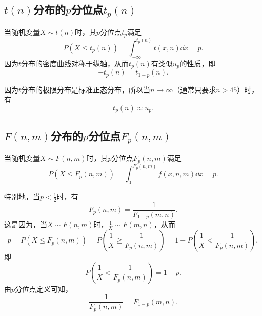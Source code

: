 \subsection{\texorpdfstring{\(t(n)\)分布的\(p\)分位点\(t_p(n)\)}{t分布的p分位点}}
当随机变量\(X \sim t(n)\)时，其\(p\)分位点\(t_p\)满足\[
P(X \leq t_p(n))
= \int_{-\infty}^{t_p(n)} t(x,n) \dd{x} = p.
\]因为\(t\)分布的密度曲线对称于纵轴，从而\(t_p(n)\)有类似\(u_p\)的性质，即\begin{equation}
-t_p(n)=t_{1-p}(n).
\end{equation}

因为\(t\)分布的极限分布是标准正态分布，所以当\(n\to\infty\)（通常只要求\(n>45\)）时，有\[
t_p(n) \approx u_p.
\]

\subsection{\texorpdfstring{\(F(n,m)\)分布的\(p\)分位点\(F_p(n,m)\)}{F分布的p分位点}}
当随机变量\(X \sim F(n,m)\)时，其\(p\)分位点\(F_p(n,m)\)满足\[
P(X \leq F_p(n,m)) = \int_0^{F_p(n,m)} f(x,n,m) \dd{x} = p.
\]

特别地，当\(p<\frac{1}{2}\)时，有\begin{equation}
F_p(n,m) = \frac{1}{F_{1-p}(m,n)}.
\end{equation}
这是因为，当\(X \sim F(n,m)\)时，\(\frac{1}{X} \sim F(m,n)\)，从而\[
p = P(X \leq F_p(n,m))
= P\left(\frac{1}{X} \geq \frac{1}{F_p(n,m)}\right)
= 1 - P\left(\frac{1}{X} < \frac{1}{F_p(n,m)}\right),
\]即\[
P\left(\frac{1}{X} < \frac{1}{F_p(n,m)}\right) = 1 - p.
\]由\(p\)分位点定义可知，\[
\frac{1}{F_p(n,m)} = F_{1-p}(m,n).
\]

